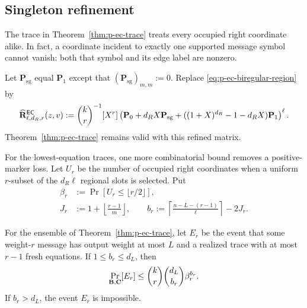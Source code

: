 \subsection{Singleton refinement}

The trace in Theorem~\ref{thm:p-ec-trace} treats every occupied right
coordinate alike.  In fact, a coordinate incident to exactly one supported
message symbol cannot vanish: both that symbol and its edge label are
nonzero.

Let $\mathbf P_{\mathrm{sg}}$ equal $\mathbf P_1$ except that
$(\mathbf P_{\mathrm{sg}})_{m,m}:=0$.  Replace
\eqref{eq:p-ec-biregular-region} by
\begin{equation}
 \widehat{\mathbf R}^{\mathsf{EC}}_{\ell,d_R,r}(z,v):=
 \binom{k}{r}^{-1}[X^r]
 \left(
 \mathbf P_0+d_RX\mathbf P_{\mathrm{sg}}+
 ((1+X)^{d_R}-1-d_RX)\mathbf P_1
 \right)^\ell.
 \label{eq:p-ec-singleton-region}
\end{equation}
Theorem~\ref{thm:p-ec-trace} remains valid with this refined matrix.

For the lowest-equation traces, one more combinatorial bound removes a
positive-marker loss.  Let $U_r$ be the number of occupied right coordinates
when a uniform $r$-subset of the $d_R\ell$ regional slots is selected.  Put
\begin{align}
 \beta_r&:=\Pr[U_r\leq\lfloor r/2\rfloor],
 \label{eq:singleton-free-probability}\\
 J_r&:=1+\left\lfloor\frac{r-1}{m}\right\rfloor,
 \qquad
 b_r:=\left\lceil\frac{n-L-(r-1)}{\ell}\right\rceil-2J_r.
 \label{eq:required-singleton-free-regions}
\end{align}

\begin{lemma}
\label{lem:singleton-free-regions}
For the ensemble of Theorem~\ref{thm:p-ec-trace}, let $E_r$ be the event
that some weight-$r$ message has output weight at most $L$ and a realized
trace with at most $r-1$ fresh equations.  If $1\leq b_r\leq d_L$, then
\begin{equation}
 \Pr_{\mathbf B,\mathbf C}[E_r]\leq
 \binom{k}{r}\binom{d_L}{b_r}\beta_r^{b_r}.
 \label{eq:singleton-free-bound}
\end{equation}
If $b_r>d_L$, the event $E_r$ is impossible.
\end{lemma}

